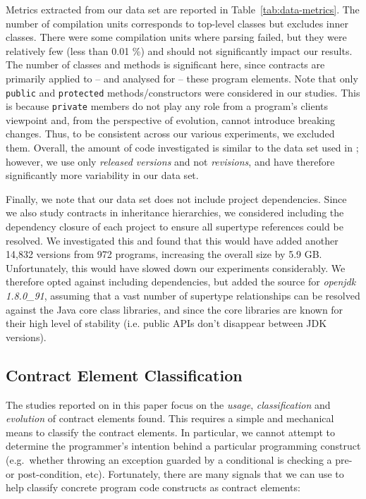 \documentclass[a4paper,UKenglish]{lipics-v2016}
\begin{document}
Metrics extracted from our data set are reported in Table~\ref{tab:data-metrics}.  The number of compilation units corresponds to top-level classes  but excludes inner classes. There were some compilation units where parsing failed, but they were relatively few (less than 0.01 \%) and should not significantly impact our results.   The number of classes and methods is significant here, since contracts are primarily applied to -- and analysed for -- these program elements.  Note that only \texttt{public} and \texttt{protected} methods/constructors were considered in our studies.  This is because \texttt{private} members do not play any role from a program's clients viewpoint and, from the perspective of evolution, cannot introduce breaking changes.  Thus, to be consistent across our various experiments, we excluded them.  Overall, the amount of code investigated is similar to the data set used in \cite{EFNPM14}; however, we use only {\em released versions} and not {\em revisions}, and have therefore significantly more variability in our data set. 



Finally, we note that our data set does not include project dependencies.  Since we also study contracts in inheritance hierarchies, we considered including the dependency closure of each project to ensure all supertype references could be resolved.  We investigated this and found that this would have added another 14,832 versions from 972 programs, increasing the overall size by 5.9 GB.  Unfortunately, this would have slowed down our experiments considerably.  We therefore opted against including dependencies, but added the source for \textit{openjdk 1.8.0\_91}, assuming that a vast number of supertype relationships can be resolved against the Java core class libraries, and since the core libraries are known for their high level of stability (i.e. public APIs don't disappear between JDK versions).

\subsection{Contract Element Classification}
\label{ssec:meth:classification}


The studies reported on in this paper focus on the {\em usage}, {\em classification} and {\em evolution} of contract elements found. This requires a simple and mechanical means to classify the contract elements. In particular, we cannot attempt to determine the programmer's intention behind a particular programming construct (e.g.\ whether throwing an exception guarded by a conditional is checking a pre- or post-condition, etc).  Fortunately, there are many signals that we can use to help classify concrete program code constructs as contract elements:
\end{document}
